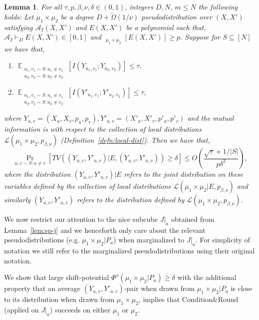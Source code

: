 \documentclass[11pt]{article}
\DeclareMathOperator*{\E}{\mathbb{E}}
\DeclareMathOperator*{\pE}{\widetilde{\mathbb{E}}}
\def \cA {\mathcal{A}}
\def \cL {\mathcal{L}}
\newtheorem{lemma}[theorem]{Lemma}
\theoremstyle{definition}
\begin{document}
\begin{lemma}\label{lem:correlation}
For all $\tau,p,\beta,\nu,\delta \in (0,1)$, integers $D,N$, $m \leq N$ the following holds: Let $\mu_1 \times \mu_2$ be a degree $D+\widetilde{\Omega}(1/\nu)$ pseudodistribution over $(X,X')$ satisfying $\cA_I(X,X')$ and $E(X,X')$ be a polynomial such that, $\cA_I \vdash_D E(X,X') \in [0,1]$ and $\pE_{\mu_1 \times \mu_2}[E(X,X')] \geq p$. Suppose for $S \subseteq [N]$ we have that, 
\begin{enumerate}
\item $\E_{\substack{u_1,v_1 \sim S: u_1 \neq v_1\\ u_2,v_2 \sim S: u_2 \neq v_2}}[I(Y_{u_1,v_1};Y_{u_2,v_2})] \leq \tau.$
\item $\E_{\substack{u_1,v_1 \sim S: u_1 \neq v_1\\ u_2,v_2 \sim S: u_2 \neq v_2}}[I(Y'_{u_1,v_1};Y'_{u_2,v_2})] \leq \tau$,
\end{enumerate}
where $Y_{u,v} = (X_u,X_v,p_u,p_v), Y'_{u,v} = (X'_u,X'_v,p'_u,p'_v)$ and the mutual information is with respect to the collection of local distributions $\cL(\mu_1 \times \mu_2,p_{\beta,\nu})$ (Definition~\ref{defn:local-dist}). Then we have that, 
\[\Pr_{u,v \sim S: u \neq v}[ TV((Y_{u,v},Y'_{u,v})|E , (Y_{u,v},Y'_{u,v})) \geq \delta] \leq O\left(\frac{\sqrt{\tau}+ 1/|S|}{p\delta^2}\right),\]
where the distribution $(Y_{u,v},Y'_{u,v})|E$ refers to the joint distribution on these variables defined by the collection of local distributions $\cL(\mu_1 \times \mu_2|E, p_{\beta,\nu})$ and similarly $(Y_{u,v},Y'_{u,v})$ refers to the distribution defined by $\cL(\mu_1 \times \mu_2,p_{\beta,\nu})$.
\end{lemma}



We now restrict our attention to the nice subcube $J|_a$ obtained from Lemma~\ref{lem:sp-j} and we henceforth only care about the relevant pseudodistributions (e.g. $\mu_1 \times \mu_2|P_a$) when marginalized to $J|_a$. For simplicity of notation we still refer to the marginalized pseudodistributions using their original notation.

We show that large shift-potential $\Phi^a(\mu_1 \times \mu_2 | P_a) \geq \delta$ with the additional property that an average $(Y_{u,v}, Y'_{u,v})$-pair when drawn from $\mu_1 \times \mu_2 |P_a$ is close to its distribution when drawn from $\mu_1 \times \mu_2$, implies that Condition\&Round (applied on $J|_a$) succeeds on either $\mu_1$ or $\mu_2$.
\end{document}
